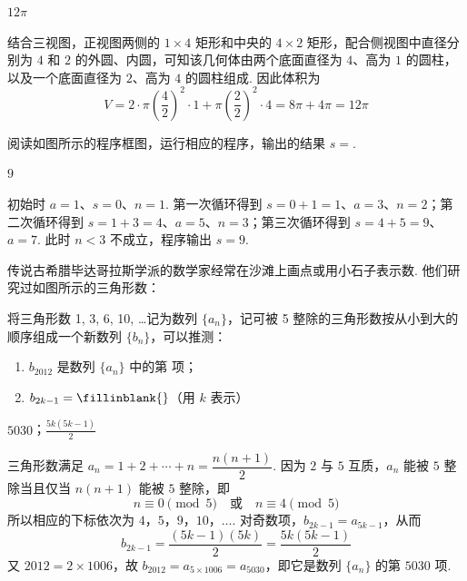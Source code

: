\begin{answer}
\(12\pi\)
\end{answer}

\begin{solution}
结合三视图，正视图两侧的 \(1\times4\) 矩形和中央的 \(4\times2\) 矩形，配合侧视图中直径分别为 \(4\) 和 \(2\) 的外圆、内圆，可知该几何体由两个底面直径为 \(4\)、高为 \(1\) 的圆柱，以及一个底面直径为 \(2\)、高为 \(4\) 的圆柱组成. 因此体积为
\[
V=2\cdot\pi\left(\frac42\right)^{2}\cdot1+\pi\left(\frac22\right)^{2}\cdot4=8\pi+4\pi=12\pi
\]
\end{solution}

\begin{problem}
阅读如图所示的程序框图，运行相应的程序，输出的结果 \(s =\)\fillinblank{}.

\end{problem}

\begin{answer}
\(9\)
\end{answer}

\begin{solution}
初始时 \(a=1\)、\(s=0\)、\(n=1\). 第一次循环得到 \(s=0+1=1\)、\(a=3\)、\(n=2\)；第二次循环得到 \(s=1+3=4\)、\(a=5\)、\(n=3\)；第三次循环得到 \(s=4+5=9\)、\(a=7\). 此时 \(n<3\) 不成立，程序输出 \(s=9\).
\end{solution}

\begin{problem}
传说古希腊毕达哥拉斯学派的数学家经常在沙滩上画点或用小石子表示数. 他们研究过如图所示的三角形数：

将三角形数 1, 3, 6, 10, \dots 记为数列 \( \{a_{n}\} \)，记可被 5 整除的三角形数按从小到大的顺序组成一个新数列 \( \{b_{n}\} \)，可以推测：
\begin{enumerate}
\item \( b_{2012} \) 是数列 \( \{a_{n}\} \) 中的第\fillinblank{} 项；
\item \( b_{2k-1} =\fillinblank{} \)（用 \(k\) 表示）
\end{enumerate}

\end{problem}

\begin{answer}
\(5030\)；\(\frac{5k(5k-1)}{2}\)
\end{answer}

\begin{solution}
三角形数满足 \(a_n=1+2+\cdots+n=\dfrac{n(n+1)}2\). 因为 \(2\) 与 \(5\) 互质，\(a_n\) 能被 \(5\) 整除当且仅当 \(n(n+1)\) 能被 \(5\) 整除，即
\[
n\equiv0\pmod5\quad\text{或}\quad n\equiv4\pmod5
\]
所以相应的下标依次为 \(4\)，\(5\)，\(9\)，\(10\)，\(\ldots\). 对奇数项，\(b_{2k-1}=a_{5k-1}\)，从而
\[
b_{2k-1}=\frac{(5k-1)(5k)}2=\frac{5k(5k-1)}2
\]
又 \(2012=2\times1006\)，故 \(b_{2012}=a_{5\times1006}=a_{5030}\)，即它是数列 \(\{a_n\}\) 的第 \(5030\) 项.
\end{solution}

